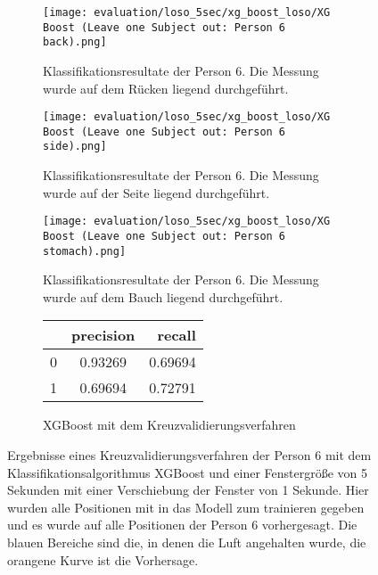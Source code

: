 
\begin{figure}[ht]
    \centering
    \begin{subfigure}{1\textwidth}
        \texttt{[image: evaluation/loso\_5sec/xg\_boost\_loso/XG Boost (Leave one Subject out: Person 6 back).png]}
        \caption{Klassifikationsresultate der Person 6. Die Messung wurde auf dem Rücken liegend durchgeführt.}
      \end{subfigure}
      \begin{subfigure}{1\textwidth}
        \texttt{[image: evaluation/loso\_5sec/xg\_boost\_loso/XG Boost (Leave one Subject out: Person 6 side).png]}
        \caption{Klassifikationsresultate der Person 6. Die Messung wurde auf der Seite liegend durchgeführt.}
      \end{subfigure}
      \begin{subfigure}{1\textwidth}
        \texttt{[image: evaluation/loso\_5sec/xg\_boost\_loso/XG Boost (Leave one Subject out: Person 6 stomach).png]}
        \caption{Klassifikationsresultate der Person 6. Die Messung wurde auf dem Bauch liegend durchgeführt.}
    \end{subfigure}
    \label{evaluation:xgboost_loso_5:person6}

    \begin{subfigure}{1\textwidth}
        \begin{center}
            \begin{tabular}{ | l | c | r | }
              \hline
               & precision & recall \\ \hline
              0 & 0.93269 & 0.69694 \\ \hline
              1 & 0.69694 & 0.72791 \\
              \hline
            \end{tabular}
        \end{center}
        \caption{XGBoost mit dem Kreuzvalidierungsverfahren}
        \label{implementation:app:screenshots:user_studies_information}
    \end{subfigure}
    \caption{Ergebnisse eines Kreuzvalidierungsverfahren der Person 6 mit dem Klassifikationsalgorithmus XGBoost und einer Fenstergröße von 5 Sekunden mit einer Verschiebung der Fenster von 1 Sekunde. Hier wurden alle Positionen mit in das Modell zum trainieren gegeben und es wurde auf alle Positionen der Person 6 vorhergesagt. Die blauen Bereiche sind die, in denen die Luft angehalten wurde, die orangene Kurve ist die Vorhersage.}
\end{figure}

